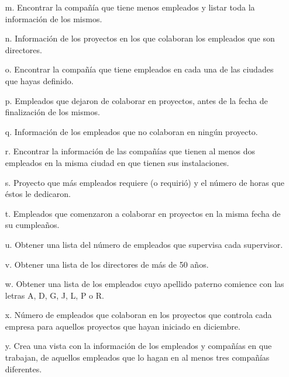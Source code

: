 \documentclass[12pt, letterpaper]{article}
\begin{document}
\begin{itemize}
\begin{itemize}
					
				\item[m.] Encontrar la compañía que tiene menos empleados y listar toda la información de los mismos.

				\item[n.] Información de los proyectos en los que colaboran los empleados que son directores.

				\item[o.] Encontrar la compañía que tiene empleados en cada una de las ciudades que hayas
				definido.

				\item[p.] Empleados que dejaron de colaborar en proyectos, antes de la fecha de finalización de los
				mismos.


				\item[q.] Información de los empleados que no colaboran en ningún proyecto.

				\item[r.] Encontrar la información de las compañías que tienen al menos dos empleados en la misma
				ciudad en que tienen sus instalaciones.

				\item[s.] Proyecto que más empleados requiere (o requirió) y el número de horas que éstos le
				dedicaron.

				\item[t.] Empleados que comenzaron a colaborar en proyectos en la misma fecha de su cumpleaños.


				\item[u.] Obtener una lista del número de empleados que supervisa cada supervisor.

				\item[v.] Obtener una lista de los directores de más de 50 años.

				\item[w.] Obtener una lista de los empleados cuyo apellido paterno comience con las letras A, D, G, J,
				L, P o R.


				\item[x.] Número de empleados que colaboran en los proyectos que controla cada empresa para
				aquellos proyectos que hayan iniciado en diciembre.
				\item[y.] Crea una vista con la información de los empleados y compañías en que trabajan, de aquellos
				      empleados que lo hagan en al menos tres compañías diferentes.	
			\end{itemize}
			                


\end{itemize}
\end{document}
